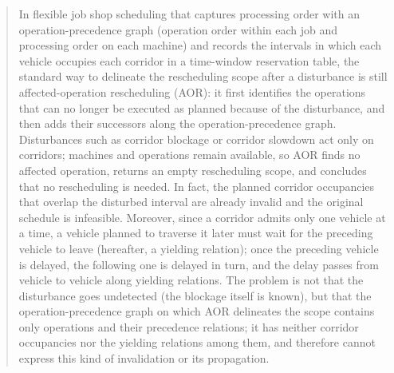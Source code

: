 \documentclass[manuscript,screen,review]{acmart}
\begin{document}
\begin{abstract}
In flexible job shop scheduling that captures processing order with an operation-precedence graph (operation order within each job and processing order on each machine)
and records the intervals in which each vehicle occupies each corridor in a time-window reservation table,
the standard way to delineate the rescheduling scope after a disturbance is still affected-operation rescheduling (AOR):
it first identifies the operations that can no longer be executed as planned because of the disturbance, and then adds their successors along the operation-precedence graph.
Disturbances such as corridor blockage or corridor slowdown act only on corridors; machines and operations remain available,
so AOR finds no affected operation, returns an empty rescheduling scope, and concludes that no rescheduling is needed.
In fact, the planned corridor occupancies that overlap the disturbed interval are already invalid and the original schedule is infeasible.
Moreover, since a corridor admits only one vehicle at a time, a vehicle planned to traverse it later must wait for the preceding vehicle to leave (hereafter, a yielding relation);
once the preceding vehicle is delayed, the following one is delayed in turn, and the delay passes from vehicle to vehicle along yielding relations.
The problem is not that the disturbance goes undetected (the blockage itself is known), but that the operation-precedence graph on which AOR delineates the scope contains only operations and their precedence relations;
it has neither corridor occupancies nor the yielding relations among them, and therefore cannot express this kind of invalidation or its propagation.


\end{abstract}
\end{document}
